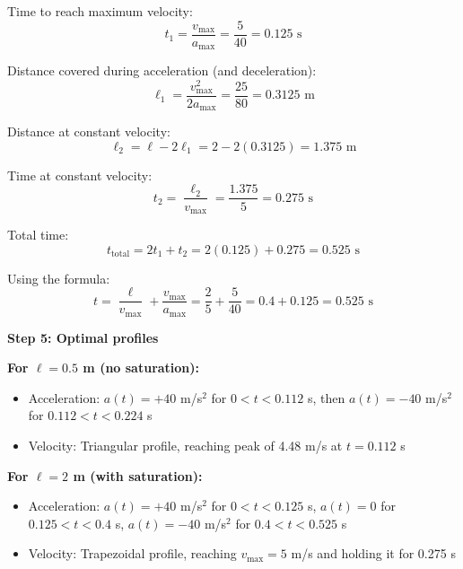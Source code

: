 \documentclass[11pt,a4paper]{article}
\begin{document}
Time to reach maximum velocity:
\begin{equation}
	t_1 = \frac{v_{\max}}{a_{\max}} = \frac{5}{40} = 0.125 \text{ s}
\end{equation}

Distance covered during acceleration (and deceleration):
\begin{equation}
	\ell_1 = \frac{v_{\max}^2}{2a_{\max}} = \frac{25}{80} = 0.3125 \text{ m}
\end{equation}

Distance at constant velocity:
\begin{equation}
	\ell_2 = \ell - 2\ell_1 = 2 - 2(0.3125) = 1.375 \text{ m}
\end{equation}

Time at constant velocity:
\begin{equation}
	t_2 = \frac{\ell_2}{v_{\max}} = \frac{1.375}{5} = 0.275 \text{ s}
\end{equation}

Total time:
\begin{equation}
	t_{\text{total}} = 2t_1 + t_2 = 2(0.125) + 0.275 = 0.525 \text{ s}
\end{equation}

Using the formula:
\begin{equation}
	t = \frac{\ell}{v_{\max}} + \frac{v_{\max}}{a_{\max}} = \frac{2}{5} + \frac{5}{40} = 0.4 + 0.125 = 0.525 \text{ s}
\end{equation}

\textbf{Step 5: Optimal profiles}

\textbf{For $\ell = 0.5$ m (no saturation):}
\begin{itemize}
\item Acceleration: $a(t) = +40$ m/s$^2$ for $0 < t < 0.112$ s, then $a(t) = -40$ m/s$^2$ for $0.112 < t < 0.224$ s
\item Velocity: Triangular profile, reaching peak of 4.48 m/s at $t = 0.112$ s
\end{itemize}

\textbf{For $\ell = 2$ m (with saturation):}
\begin{itemize}
\item Acceleration: $a(t) = +40$ m/s$^2$ for $0 < t < 0.125$ s, $a(t) = 0$ for $0.125 < t < 0.4$ s, $a(t) = -40$ m/s$^2$ for $0.4 < t < 0.525$ s
\item Velocity: Trapezoidal profile, reaching $v_{\max} = 5$ m/s and holding it for 0.275 s
\end{itemize}
\end{document}
